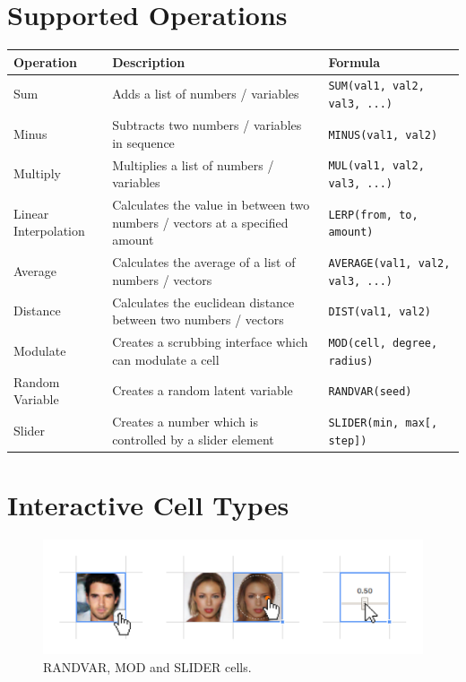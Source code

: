 \documentclass[letterpaper]{article}
\begin{document}
\section*{Supported Operations}

\renewcommand{\arraystretch}{1.5}

\begin{center}
    \begin{tabular}{ | l | p{6cm} | p{5.6cm} |}
    \hline \textbf{Operation} & \textbf{Description} & \textbf{Formula} \\ \hline
    Sum & Adds a list of numbers / variables  & \texttt{SUM(val1, val2, val3, ...)} \\ \hline
    Minus & Subtracts two numbers / variables in sequence  & \texttt{MINUS(val1, val2)} \\ \hline
    Multiply & Multiplies a list of numbers / variables  & \texttt{MUL(val1, val2, val3, ...)} \\ \hline
    Linear Interpolation & Calculates the value in between two numbers / vectors at a specified amount  & \texttt{LERP(from, to, amount)} \\ \hline
    Average & Calculates the average of a list of numbers / vectors  & \texttt{AVERAGE(val1, val2, val3, ...)} \\ \hline
    Distance & Calculates the euclidean distance between two numbers / vectors  & \texttt{DIST(val1, val2)} \\ \hline
    Modulate & Creates a scrubbing interface which can modulate a cell  & \texttt{MOD(cell, degree, radius)} \\ \hline
    Random Variable & Creates a random latent variable  & \texttt{RANDVAR(seed)} \\ \hline
    Slider & Creates a number which is controlled by a slider element  & \texttt{SLIDER(min, max[, step])} \\ \hline
    \end{tabular}
\end{center}


\section*{Interactive Cell Types}

\begin{figure}[ht!]
  \centering
  \includegraphics[width=12cm]{figs/03-cell-types.jpg}
  \caption{RANDVAR, MOD and SLIDER cells.}
\end{figure}
\end{document}
